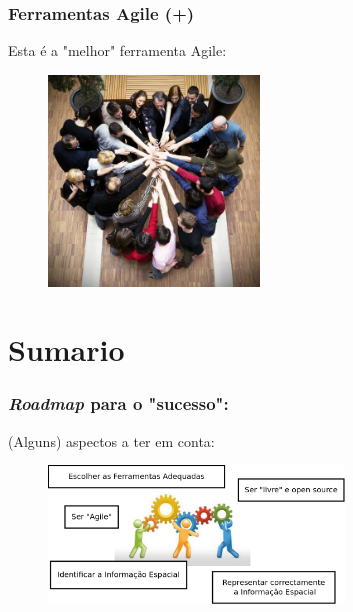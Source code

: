 \documentclass[hyperref={pdfpagelabels=true}]{beamer}
\begin{document}
\begin{frame}
\frametitle{Ferramentas Agile (+)}
Esta \'{e} a "melhor" ferramenta Agile:
\begin{figure}
  \includegraphics[width=0.5\textwidth]{agile_team.jpg}
\end{figure}
\end{frame}

\section{Sumario}
\begin{frame}
\frametitle{\textit{Roadmap} para o "sucesso":}
(Alguns) aspectos a ter em conta:
\begin{figure}
  \includegraphics[width=0.7\textwidth]{Diagram1.png}
\end{figure}
\end{frame}
\end{document}
